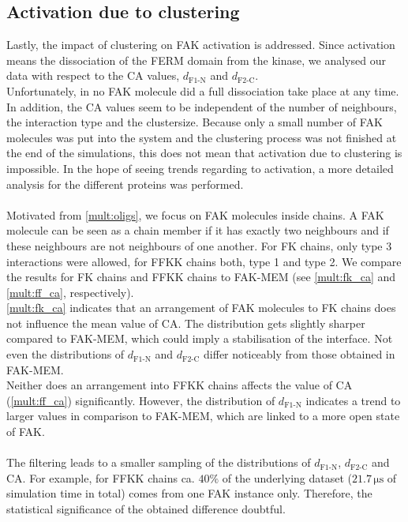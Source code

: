 \subsection{Activation due to clustering}
Lastly, the impact of clustering on FAK activation is addressed. Since activation means the dissociation of the FERM domain from the kinase, we analysed our data with respect to the CA values, $d_\text{F1-N}$ and $d_\text{F2-C}$.\\
Unfortunately, in no FAK molecule did a full dissociation take place at any time. In addition, the CA values seem to be independent of the number of neighbours, the interaction type and the clustersize. Because only a small number of FAK molecules was put into the system and the clustering process was not finished at the end of the simulations, this does not mean that activation due to clustering is impossible. In the hope of seeing trends regarding to activation, a more detailed analysis for the different proteins was performed.\\
\\
Motivated from \autoref{mult:oligs}, we focus on FAK molecules inside chains. A FAK molecule can be seen as a chain member if it has exactly two neighbours and if these neighbours are not neighbours of one another. For FK chains, only type 3 interactions were allowed, for FFKK chains both, type 1 and type 2. We compare the results for FK chains and FFKK chains to FAK-MEM (see \autoref{mult:fk_ca} and \autoref{mult:ff_ca}, respectively).\\
\autoref{mult:fk_ca} indicates that an arrangement of FAK molecules to FK chains does not influence the mean value of CA. The distribution gets slightly sharper compared to FAK-MEM, which could imply a stabilisation of the interface. Not even the distributions of $d_\text{F1-N}$ and $d_\text{F2-C}$ differ noticeably from those obtained in FAK-MEM.\\
Neither does an arrangement into FFKK chains affects the value of CA (\autoref{mult:ff_ca}) significantly. However, the distribution of $d_\text{F1-N}$ indicates a trend to larger values in comparison to FAK-MEM, which are linked to a more open state of FAK.\\
\\
The filtering leads to a smaller sampling of the distributions of $d_\text{F1-N}$, $d_\text{F2-C}$ and CA. For example, for FFKK chains ca. $40\%$ of the underlying dataset ($21.7\,\si{\micro\second}$ of simulation time in total) comes from one FAK instance only. Therefore, the statistical significance of the obtained difference doubtful.
